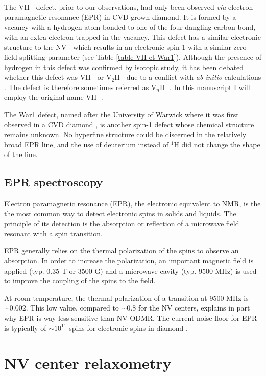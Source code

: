 \documentclass[a4paper,11pt]{report}
\begin{document}
\begin{refsection}
The VH$^-$ defect, prior to our observations, had only been observed \textit{via} electron paramagnetic resonance (EPR) in CVD grown diamond. It is formed by a vacancy with a hydrogen atom bonded to one of the four dangling carbon bond, with an extra electron trapped in the vacancy. This defect has a similar electronic structure to the NV$^-$ which results in an electronic spin-1 with a similar zero field splitting parameter (see Table \ref{table VH et War1}). Although the presence of hydrogen in this defect was confirmed by isotopic study, it has been debated whether this defect was VH$^-$ or V$_2$H$^-$ due to a conflict with \textit{ab initio} calculations \citep{shaw2005importance}. The defect is therefore sometimes referred as V$_n$H$^-$. In this manuscript I will employ the original name VH$^-$.

The War1 defect, named after the University of Warwick where it was first observed in a CVD diamond \citep{cruddace2007magnetic}, is another spin-1 defect whose chemical structure remains unknown. No hyperfine structure could be discerned in the relatively broad EPR line, and the use of deuterium instead of $^1$H did not change the shape of the line.

\subsection{EPR spectroscopy}
Electron paramagnetic resonance (EPR), the electronic equivalent to NMR, is the the most common way to detect electronic spins in solids and liquids. The principle of its detection is the absorption or reflection of a microwave field resonant with a spin transition.

EPR generally relies on the thermal polarization of the spins to observe an absorption. In order to increase the polarization, an important magnetic field is applied (typ. 0.35 T or 3500 G) and a microwave cavity (typ. 9500 MHz) is used to improve the coupling of the spins to the field.

At room temperature, the thermal polarization of a transition at 9500 MHz is $\sim 0.002$. This low value, compared to $\sim 0.8$ for the NV centers, explains in part why EPR is way less sensitive than NV ODMR. The current noise floor for EPR is typically of $\sim 10^{11}$ spins for electronic spins in diamond \citep{mitchell2013x}.

\section{NV center relaxometry}


\end{refsection}
\end{document}
